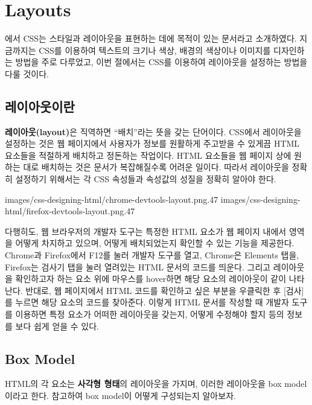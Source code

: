 \section{Layouts} \label{sect:layouts}

에서 CSS는 스타일과 레이아웃을 표현하는 데에 목적이 있는 문서라고 소개하였다. 지금까지는 CSS를 이용하여 텍스트의 크기나 색상, 배경의 색상이나 이미지를 디자인하는 방법을 주로 다루었고, 이번 절에서는 CSS를 이용하여 레이아웃을 설정하는 방법을 다룰 것이다.

\subsection*{레이아웃이란}
\textbf{레이아웃(layout)}은 직역하면 ``배치''라는 뜻을 갖는 단어이다. CSS에서 레이아웃을 설정하는 것은 웹 페이지에서 사용자가 정보를 원활하게 주고받을 수 있게끔 HTML 요소들을 적절하게 배치하고 정돈하는 작업이다. HTML 요소들을 웹 페이지 상에 원하는 대로 배치하는 것은 문서가 복잡해질수록 어려운 일이다. 따라서 레이아웃을 정확히 설정하기 위해서는 각 CSS 속성들과 속성값의 성질을 정확히 알아야 한다.

    {
            {images/css-designing-html/chrome-devtools-layout.png}{.47}
            {images/css-designing-html/firefox-devtools-layout.png}{.47}
    }

다행히도, 웹 브라우저의 개발자 도구는 특정한 HTML 요소가 웹 페이지 내에서 영역을 어떻게 차지하고 있으며, 어떻게 배치되었는지 확인할 수 있는 기능을 제공한다. Chrome과 Firefox에서 F12를 눌러 개발자 도구를 열고, Chrome은 Elements 탭을, Firefox는 검사기 탭을 눌러 열려있는 HTML 문서의 코드를 띄운다. 그리고 레이아웃을 확인하고자 하는 요소 위에 마우스를 hover하면 해당 요소의 레이아웃이 \과 같이 나타난다. 반대로, 웹 페이지에서 HTML 코드를 확인하고 싶은 부분을 우클릭한 후 [검사]를 누르면 해당 요소의 코드를 찾아준다. 이렇게 HTML 문서를 작성할 때 개발자 도구를 이용하면 특정 요소가 어떠한 레이아웃을 갖는지, 어떻게 수정해야 할지 등의 정보를 보다 쉽게 얻을 수 있다.

\subsection*{Box Model}
HTML의 각 요소는 \textbf{사각형 형태}의 레이아웃을 가지며, 이러한 레이아웃을 box model이라고 한다. \을 참고하여 box model이 어떻게 구성되는지 알아보자.

